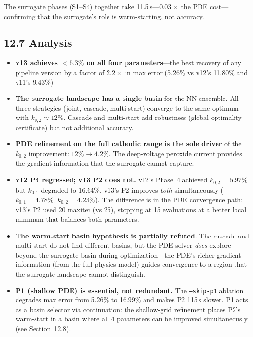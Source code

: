 \documentclass[11pt]{article}
\begin{document}
The surrogate phases (S1--S4) together take 11.5\,s---$0.03\times$ the PDE
cost---confirming that the surrogate's role is warm-starting, not accuracy.

\subsection*{12.7 Analysis}

\begin{itemize}
  \item \textbf{v13 achieves $<5.3\%$ on all four parameters}---the best
        recovery of any pipeline version by a factor of $2.2\times$ in max
        error (5.26\% vs v12's 11.80\% and v11's 9.43\%).

  \item \textbf{The surrogate landscape has a single basin} for the NN
        ensemble.  All three strategies (joint, cascade, multi-start)
        converge to the same optimum with $k_{0,2} \approx 12\%$.  Cascade
        and multi-start add robustness (global optimality certificate)
        but not additional accuracy.

  \item \textbf{PDE refinement on the full cathodic range is the sole driver}
        of the $k_{0,2}$ improvement: $12\% \to 4.2\%$.  The deep-voltage
        peroxide current provides the gradient information that the
        surrogate cannot capture.

  \item \textbf{v12 P4 regressed; v13 P2 does not.}  v12's Phase~4 achieved
        $k_{0,2} = 5.97\%$ but $k_{0,1}$ degraded to 16.64\%.  v13's P2
        improves \textit{both} simultaneously ($k_{0,1} = 4.78\%$,
        $k_{0,2} = 4.23\%$).  The difference is in the PDE convergence
        path: v13's P2 used 20 maxiter (vs 25), stopping at 15 evaluations
        at a better local minimum that balances both parameters.

  \item \textbf{The warm-start basin hypothesis is partially refuted.}
        The cascade and multi-start do not find different basins, but the
        PDE solver \textit{does} explore beyond the surrogate basin
        during optimization---the PDE's richer gradient information
        (from the full physics model) guides convergence to a region
        that the surrogate landscape cannot distinguish.

  \item \textbf{P1 (shallow PDE) is essential, not redundant.}
        The \texttt{--skip-p1} ablation degrades max error from 5.26\%
        to 16.99\% and makes P2 115\,s slower.  P1 acts as a basin
        selector via continuation: the shallow-grid refinement places
        P2's warm-start in a basin where all 4 parameters can be
        improved simultaneously (see Section~12.8).
\end{itemize}
\end{document}
